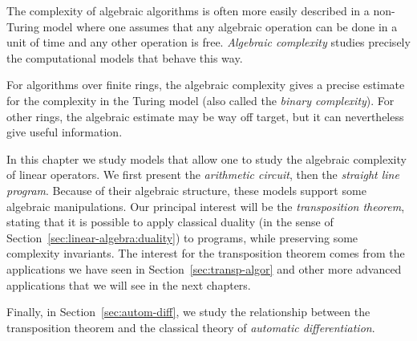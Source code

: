 The complexity of algebraic algorithms is often more easily described
in a non-Turing model where one assumes that any algebraic operation
can be done in a unit of time and any other operation is
free. \emph{Algebraic complexity} studies precisely the computational
models that behave this way.

For algorithms over finite rings, the algebraic complexity gives a
precise estimate for the complexity in the Turing model (also called
the \emph{binary complexity}). For other rings, the algebraic estimate
may be way off target, but it can nevertheless give useful information.

In this chapter we study models that allow one to study the algebraic
complexity of linear operators. We first present the \emph{arithmetic
  circuit}, then the \emph{straight line program}. Because of their
algebraic structure, these models support some algebraic
manipulations.  Our principal interest will be the \emph{transposition
  theorem}, stating that it is possible to apply classical duality (in
the sense of Section~\ref{sec:linear-algebra:duality}) to programs,
while preserving some complexity invariants. The interest for the
transposition theorem comes from the applications we have seen in
Section~\ref{sec:transp-algor} and other more advanced applications
that we will see in the next chapters.

Finally, in Section~\ref{sec:autom-diff}, we study the
relationship between the transposition theorem and the classical
theory of \emph{automatic differentiation}.



%
